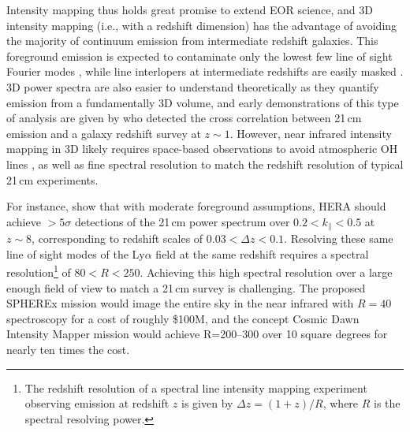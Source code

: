 \documentclass[numberedappendix]{emulateapj}
\begin{document}
Intensity mapping thus holds great promise to extend EOR science, and 3D intensity mapping (i.e., with a redshift dimension) has the advantage of avoiding the majority of continuum emission from intermediate redshift galaxies. This foreground emission is expected to contaminate only the lowest few line of sight Fourier modes \citep{gong17}, while line interlopers at intermediate redshifts are easily masked \citep{Gong2014,gong17,pullen14,Comaschi16}. 3D power spectra are also easier to understand theoretically as they quantify emission from a fundamentally 3D volume, and early demonstrations of this type of analysis are given by \citet{Chang2010,Masui2013} who detected the cross correlation between 21\,cm emission and a galaxy redshift survey at $z\sim1$. However, near infrared intensity mapping in 3D likely requires space-based observations to avoid atmospheric OH lines \citep[e.g.][]{sullivan12}, as well as fine spectral resolution to match the redshift resolution of typical 21\,cm experiments. 

For instance, \citet{PoberNextGen} show that with moderate foreground assumptions, HERA should achieve $>5\sigma$ detections of the 21\,cm power spectrum 	over $0.2<k_\parallel<0.5$ at $z\sim8$, corresponding to redshift scales of $0.03<\Delta z<0.1$. Resolving these same line of sight modes of the Ly$\alpha$ field at the same redshift requires a spectral resolution\footnote{The redshift resolution of a spectral line intensity mapping experiment observing emission at redshift $z$ is given by $\Delta z=(1+z)/R$, where $R$ is the spectral resolving power.} of $80<R<250$. Achieving this high spectral resolution over a large enough field of view to match a 21\,cm survey is challenging. The proposed SPHEREx mission \citep{ScienceWithSpherex,SpherexWhitePaper} would image the entire sky in the near infrared with $R=40$ spectroscopy for a cost of roughly \$100M, and the concept Cosmic Dawn Intensity Mapper \citep{cooray16} mission would achieve R=200--300 over 10 square degrees for nearly ten times the cost.
\end{document}
